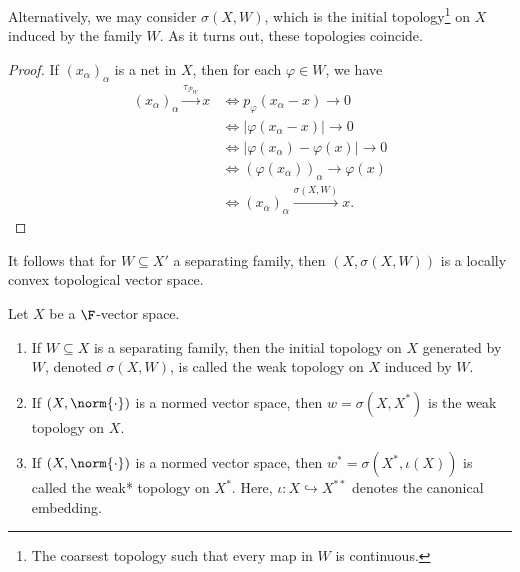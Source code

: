 \documentclass[10pt]{mypackage}
\begin{document}
Alternatively, we may consider $\sigma\left(X,W\right)$, which is the initial topology\footnote{The coarsest topology such that every map in $W$ is continuous.} on $X$ induced by the family $W$. As it turns out, these topologies coincide.
\begin{proof}
  If $\left(x_{\alpha}\right)_{\alpha}$ is a net in $X$, then for each $\varphi\in W$, we have
  \begin{align*}
    \left(x_{\alpha}\right)_{\alpha}\xrightarrow{\tau_{\mathcal{P}_{W}}}x &\Leftrightarrow p_{\varphi}\left(x_{\alpha} - x\right)\rightarrow 0\\
                                                                          &\Leftrightarrow \left\vert \varphi\left(x_{\alpha} - x\right) \right\vert\rightarrow 0\\
                                                                          &\Leftrightarrow \left\vert \varphi\left(x_{\alpha}\right) - \varphi\left(x\right) \right\vert \rightarrow 0\\
                                                                          &\Leftrightarrow \left(\varphi\left(x_{\alpha}\right)\right)_{\alpha}\rightarrow \varphi\left(x\right)\\
                                                                          &\Leftrightarrow \left(x_{\alpha}\right)_{\alpha}\xrightarrow{\sigma\left(X,W\right)}x.
  \end{align*}
\end{proof}
It follows that for $W\subseteq X'$ a separating family, then $\left(X,\sigma\left(X,W\right)\right)$ is a locally convex topological vector space.
\begin{definition}
  Let $X$ be a $\F$-vector space.
  \begin{enumerate}[(1)]
    \item If $W\subseteq X$ is a separating family, then the initial topology on $X$ generated by $W$, denoted $\sigma\left(X,W\right)$, is called the weak topology on $X$ induced by $W$.
    \item If $\left(X,\norm{\cdot}\right)$ is a normed vector space, then $w = \sigma\left(X,X^{\ast}\right)$ is the weak topology on $X$.
    \item If $\left(X,\norm{\cdot}\right)$ is a normed vector space, then $w^{\ast} = \sigma\left(X^{\ast},\iota\left(X\right)\right)$ is called the weak* topology on $X^{\ast}$. Here, $\iota: X\hookrightarrow X^{\ast\ast}$ denotes the canonical embedding.
  \end{enumerate}
\end{definition}
\end{document}
